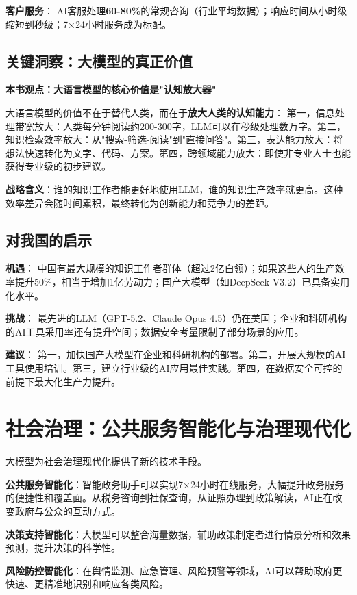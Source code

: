 \textbf{客户服务}：
AI客服处理\textbf{60-80\%}的常规咨询（行业平均数据）；响应时间从小时级缩短到秒级；7×24小时服务成为标配。

\subsection{关键洞察：大模型的真正价值}

\textbf{本书观点：大语言模型的核心价值是"认知放大器"}

大语言模型的价值不在于替代人类，而在于\textbf{放大人类的认知能力}：
第一，信息处理带宽放大：人类每分钟阅读约200-300字，LLM可以在秒级处理数万字。第二，知识检索效率放大：从"搜索-筛选-阅读"到"直接问答"。第三，表达能力放大：将想法快速转化为文字、代码、方案。第四，跨领域能力放大：即使非专业人士也能获得专业级的初步建议。

\textbf{战略含义}：谁的知识工作者能更好地使用LLM，谁的知识生产效率就更高。这种效率差异会随时间累积，最终转化为创新能力和竞争力的差距。

\subsection{对我国的启示}

\textbf{机遇}：
中国有最大规模的知识工作者群体（超过2亿白领）；如果这些人的生产效率提升50\%，相当于增加1亿劳动力；国产大模型（如DeepSeek-V3.2）已具备实用化水平。

\textbf{挑战}：
最先进的LLM（GPT-5.2、Claude Opus 4.5）仍在美国；企业和科研机构的AI工具采用率还有提升空间；数据安全考量限制了部分场景的应用。

\textbf{建议}：
第一，加快国产大模型在企业和科研机构的部署。第二，开展大规模的AI工具使用培训。第三，建立行业级的AI应用最佳实践。第四，在数据安全可控的前提下最大化生产力提升。

\section{社会治理：公共服务智能化与治理现代化}

大模型为社会治理现代化提供了新的技术手段。

\textbf{公共服务智能化}：智能政务助手可以实现7×24小时在线服务，大幅提升政务服务的便捷性和覆盖面。从税务咨询到社保查询，从证照办理到政策解读，AI正在改变政府与公众的互动方式。

\textbf{决策支持智能化}：大模型可以整合海量数据，辅助政策制定者进行情景分析和效果预测，提升决策的科学性。

\textbf{风险防控智能化}：在舆情监测、应急管理、风险预警等领域，AI可以帮助政府更快速、更精准地识别和响应各类风险。

